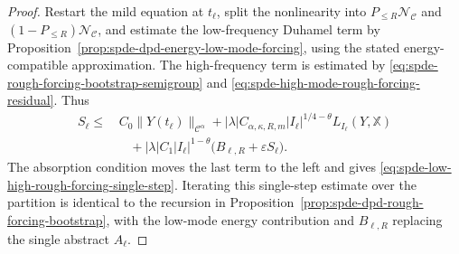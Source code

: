 \begin{proof}
Restart the mild equation at \(t_\ell\), split the nonlinearity into
\(P_{\leq R}\mathcal N_{\mathcal C}\) and
\((1-P_{\leq R})\mathcal N_{\mathcal C}\), and estimate the low-frequency
Duhamel term by
Proposition~\ref{prop:spde-dpd-energy-low-mode-forcing}, using the stated
energy-compatible approximation.  The high-frequency term is estimated by
\eqref{eq:spde-rough-forcing-bootstrap-semigroup} and
\eqref{eq:spde-high-mode-rough-forcing-residual}.  Thus
\[
\begin{aligned}
  S_\ell
  \leq
  &\,C_0\|Y(t_\ell)\|_{\mathcal C^\alpha}
  +|\lambda|C_{\alpha,\kappa,R,m}
      |I_\ell|^{1/4-\theta}L_{I_\ell}(Y,\mathbb X)
\\
  &\quad
  +|\lambda|C_1|I_\ell|^{1-\theta}
      \bigl(B_{\ell,R}+\varepsilon S_\ell\bigr).
\end{aligned}
\]
The absorption condition moves the last term to the left and gives
\eqref{eq:spde-low-high-rough-forcing-single-step}.  Iterating this
single-step estimate over the partition is identical to the recursion in
Proposition~\ref{prop:spde-dpd-rough-forcing-bootstrap}, with the low-mode
energy contribution and \(B_{\ell,R}\) replacing the single abstract
\(A_\ell\).
\end{proof}

